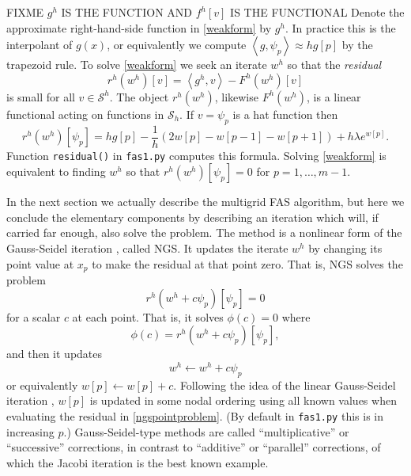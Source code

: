 \documentclass[letterpaper,final,12pt,reqno]{amsart}
\newcommand{\ip}[2]{\left<#1,#2\right>}
\begin{document}
FIXME $g^h$ IS THE FUNCTION AND $f^h[v]$ IS THE FUNCTIONAL Denote the approximate right-hand-side function in \eqref{weakform} by $g^h$.  In practice this is the interpolant of $g(x)$, or equivalently we compute $\ip{g}{\psi_p}\approx h g[p]$ by the trapezoid rule.   To solve \eqref{weakform} we seek an iterate $w^h$ so that the \emph{residual}
\begin{equation}
  r^h(w^h)[v] = \ip{g^h}{v} - F^h(w^h)[v]  \label{feresidual}
\end{equation}
is small for all $v\in \mathcal{S}^h$.  The object $r^h(w^h)$, likewise $F^h(w^h)$, is a linear functional acting on functions in $\mathcal{S}_h$.  If $v=\psi_p$ is a hat function then
\begin{equation}
  r^h(w^h)[\psi_p] = h g[p] - \frac{1}{h}\left(2w[p]-w[p-1]-w[p+1]\right) + h \lambda e^{w[p]}.  \label{feresidualdetail}
\end{equation}
Function \texttt{residual()} in \texttt{fas1.py} computes this formula.  Solving \eqref{weakform} is equivalent to finding $w^h$ so that $r^h(w^h)[\psi_p]=0$ for $p=1,\dots,m-1$.

In the next section we actually describe the multigrid FAS algorithm, but here we conclude the elementary components by describing an iteration which will, if carried far enough, also solve the problem.  The method is a nonlinear form of the Gauss-Seidel iteration \cite{Briggsetal2000}, called NGS.  It updates the iterate $w^h$ by changing its point value at $x_p$ to make the residual at that point zero.  That is, NGS solves the problem
\begin{equation}
r^h(w^h + c \psi_p)[\psi_p] = 0  \label{ngspointproblem}
\end{equation}
for a scalar $c$ at each point.  That is, it solves $\phi(c)=0$ where
\begin{equation}
  \phi(c) = r^h(w^h + c \psi_p)[\psi_p], \label{ngspointresidual}
\end{equation}
and then it updates
\begin{equation}
  w^h \leftarrow w^h + c \psi_p  \label{ngspointupdate}
\end{equation}
or equivalently $w[p] \leftarrow w[p] + c$.  Following the idea of the linear Gauss-Seidel iteration \cite{Greenbaum1997}, $w[p]$ is updated in some nodal ordering using all known values when evaluating the residual in \eqref{ngspointproblem}.  (By default in \texttt{fas1.py} this is in increasing $p$.)  Gauss-Seidel-type methods are called ``multiplicative'' or ``successive'' corrections, in contrast to ``additive'' or ``parallel'' corrections, of which the Jacobi iteration is the best known example.
\end{document}
